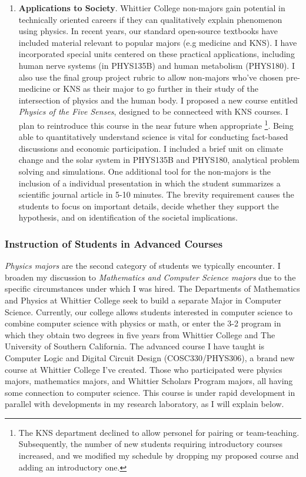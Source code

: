 \documentclass[../../main.tex]{subfiles}
\begin{document}
\begin{enumerate}
\item \textbf{Applications to Society}. Whittier College non-majors gain potential in technically oriented careers if they can qualitatively explain phenomenon using physics.  In recent years, our standard open-source textbooks have included material relevant to popular majors (e.g medicine and KNS). I have incorporated special units centered on these practical applications, including human nerve systems (in PHYS135B) and human metabolism (PHYS180).  I also use the final group project rubric to allow non-majors who've chosen pre-medicine or KNS as their major to go further in their study of the intersection of physics and the human body.  I proposed a new course entitled \textit{Physics of the Five Senses}, designed to be connecteed with KNS courses.  I plan to reintroduce this course in the near future when appropriate \footnote{The KNS department declined to allow personel for pairing or team-teaching.  Subsequently, the number of new students requiring introductory courses increased, and we modified my schedule by dropping my proposed course and adding an introductory one.}. Being able to quantitatively understand science is vital for conducting fact-based discussions and economic participation.  I included a brief unit on climate change and the solar system in PHYS135B and PHYS180, analytical problem solving and simulations.  One additional tool for the non-majors is the inclusion of a individual presentation in which the student summarizes a scientific journal article in 5-10 minutes.  The brevity requirement causes the students to focus on important details, decide whether they support the hypothesis, and on identification of the societal implications.
\end{enumerate}

\subsubsection{Instruction of Students in Advanced Courses}

\label{sec:teaching_phil2}

\textit{Physics majors} are the second category of students we typically encounter.  I broaden my discussion to \textit{Mathematics and Computer Science majors} due to the specific circumstances under which I was hired.  The Departments of Mathematics and Physics at Whittier College seek to build a separate Major in Computer Science.  Currently, our college allows students interested in computer science to combine computer science with physics or math, or enter the 3-2 program in which they obtain two degrees in five years from Whittier College and The University of Southern California.  The advanced course I have taught is Computer Logic and Digital Circuit Design (COSC330/PHYS306), a brand new course at Whittier College I've created.  Those who participated were physics majors, mathematics majors, and Whittier Scholars Program majors, all having some connection to computer science.  This course is under rapid development in parallel with developments in my research laboratory, as I will explain below. \\ \hspace{0.1cm}
\end{document}
